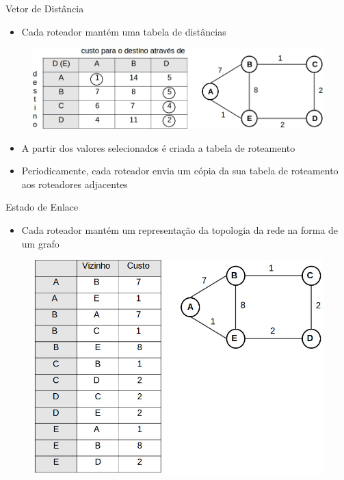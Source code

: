\documentclass{beamer}
\newlength{\wideitemsep}
\let\olditem\item
\renewcommand{\item}{\setlength{\itemsep}{\wideitemsep}\olditem}
\begin{document}
\begin{frame}{Vetor de Distância}
\begin{itemize}
 \item Cada roteador mantém uma tabela de distâncias %
\end{itemize}
\begin{figure}[!htb]
\centering
\includegraphics[scale=0.35]{vetor_de_distancia.jpg}
\end{figure}
\begin{itemize}
 \item A partir dos valores selecionados é criada a tabela de roteamento
 \item Periodicamente, cada roteador envia um cópia da sua tabela de roteamento aos roteadores adjacentes %
\end{itemize}
\end{frame}

\begin{frame}{Estado de Enlace}
\begin{itemize}
 \item Cada roteador mantém um representação da topologia da rede na forma de um grafo  %
\end{itemize}
\begin{figure}[!htb]
\centering
\includegraphics[scale=0.30]{grafo.jpg}
\end{figure}
\end{frame}
\end{document}
